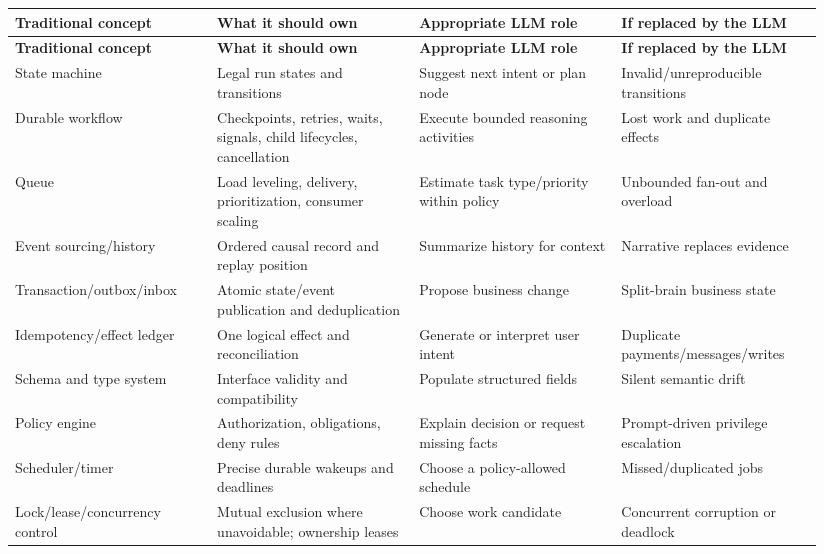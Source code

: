 \BookTableStart
\fontsize{7.2}{9}\selectfont
\begin{longtable}{@{}Y{0.2350\linewidth}Y{0.2350\linewidth}Y{0.2350\linewidth}Y{0.2350\linewidth}@{}}
\color{white}\bfseries \textbf{Traditional concept} & \color{white}\bfseries \textbf{What it should own} & \color{white}\bfseries \textbf{Appropriate LLM role} & \color{white}\bfseries \textbf{If replaced by the LLM} \\
\endfirsthead
{}
\color{white}\bfseries \textbf{Traditional concept} & \color{white}\bfseries \textbf{What it should own} & \color{white}\bfseries \textbf{Appropriate LLM role} & \color{white}\bfseries \textbf{If replaced by the LLM} \\
\endhead
State machine & Legal run states and transitions & Suggest next intent or plan node & Invalid/unreproducible transitions \\
Durable workflow & Checkpoints, retries, waits, signals, child lifecycles, cancellation & Execute bounded reasoning activities & Lost work and duplicate effects \\
Queue & Load leveling, delivery, prioritization, consumer scaling & Estimate task type/priority within policy & Unbounded fan-out and overload \\
Event sourcing/history & Ordered causal record and replay position & Summarize history for context & Narrative replaces evidence \\
Transaction/outbox/inbox & Atomic state/event publication and deduplication & Propose business change & Split-brain business state \\
Idempotency/effect ledger & One logical effect and reconciliation & Generate or interpret user intent & Duplicate payments/messages/writes \\
Schema and type system & Interface validity and compatibility & Populate structured fields & Silent semantic drift \\
Policy engine & Authorization, obligations, deny rules & Explain decision or request missing facts & Prompt-driven privilege escalation \\
Scheduler/timer & Precise durable wakeups and deadlines & Choose a policy-allowed schedule & Missed/duplicated jobs \\
Lock/lease/concurrency control & Mutual exclusion where unavoidable; ownership leases & Choose work candidate & Concurrent corruption or deadlock \\

\end{longtable}
